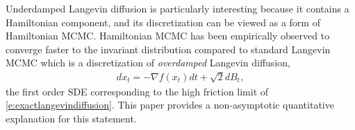 Underdamped Langevin diffusion is particularly interesting because it contains a Hamiltonian component, and its discretization can be viewed as a form of Hamiltonian MCMC. Hamiltonian MCMC \citep[see review of HMC in][]{neal,betan} has been empirically observed to converge faster to the invariant distribution compared to standard Langevin MCMC which is a discretization of \emph{overdamped} Langevin diffusion,
\begin{align*}
dx_t = -\nabla f(x_t) dt + \sqrt{2}dB_t,
\end{align*}
the first order SDE corresponding to the high friction limit of \eqref{e:exactlangevindiffusion}. This paper provides a non-asymptotic quantitative explanation for this statement.